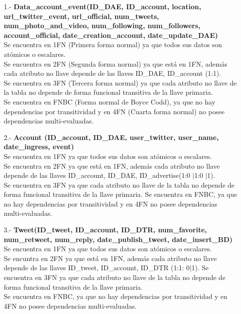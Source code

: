 \documentclass{memoria}
\begin{document}
\begin{itemize}
\item[1.-]\textbf{ Data\_account\_event(ID\_DAE, ID\_account, location, url\_twitter\_event,	 url\_official, num\_tweets,  num\_photo\_and\_video, num\_following, num\_followers,  account\_official, date\_creation\_account, date\_update\_DAE)} \\
Se encuentra en 1FN (Primera forma normal) ya que todos sus datos son atómicos o escalares.\\
Se encuentra en 2FN (Segunda forma normal) ya que está en 1FN, además cada atributo no llave depende de las llaves ID\_DAE, ID\_account (1:1).\\
 Se encuentra en 3FN (Tercera forma normal) ya que cada atributo no llave de la tabla no depende de forma funcional transitiva de la llave primaria.\\ 
Se encuentra en FNBC (Forma normal de Boyce Codd), ya que no hay dependencias por transitividad y en 4FN (Cuarta forma normal) no posee dependencias multi-evaluadas.

\item[2.-]\textbf{Account (ID\_account, ID\_DAE, user\_twitter, user\_name, date\_ingress, event)}
\\
Se encuentra en 1FN ya que todos sus datos son atómicos o escalares.\\
Se encuentra en 2FN ya que está en 1FN, además cada atributo no llave depende de las llaves ID\_account, ID\_DAE, ID\_advertise(1:0 $|$1:0 $|$1). \\
Se encuentra en 3FN ya que cada atributo no llave de la tabla no depende de forma funcional transitiva de la llave primaria. Se encuentra en FNBC,  ya que no hay dependencias por transitividad y en  4FN no posee dependencias multi-evaluadas. 

\item[3.-]\textbf{Tweet(ID\_tweet, ID\_account, ID\_DTR, num\_favorite, num\_retweet, num\_reply, date\_publish\_tweet, date\_insert\_BD)}
\\
Se encuentra en 1FN ya que todos sus datos son atómicos o escalares.\\
Se encuntra en 2FN ya que está en 1FN, además cada atributo no llave depende de las llaves ID\_tweet, ID\_account, ID\_DTR (1:1: 0$|$1). Se encuentra en 3FN ya que cada atributo no llave de la tabla no depende de forma funcional transitiva de la llave primaria. \\
Se encuentra en FNBC, ya que no hay dependencias por transitividad y en 4FN no posee dependencias multi-evaluadas.


\end{itemize}
\end{document}
